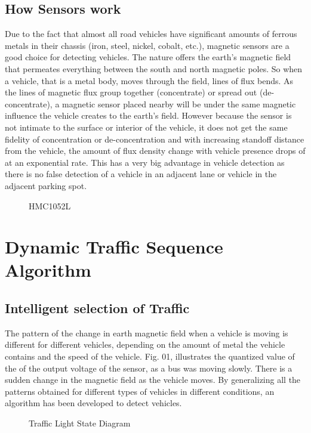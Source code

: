 \documentclass{SureshLimkar}
\begin{document}
\section{How Sensors work}
\hspace {0.5 in}Due to the fact that almost all road vehicles have significant amounts of ferrous metals in their chassis (iron, steel, nickel, cobalt, etc.), magnetic sensors are a good choice for detecting vehicles. The nature offers the earth’s magnetic field that permeates everything between the south and north magnetic poles. So when a vehicle, that is a metal body, moves through the field, lines of flux bends. As the lines of magnetic flux group together (concentrate) or spread out (de-concentrate), a magnetic sensor placed nearby will be under the same magnetic influence the vehicle creates to the earth’s field. However because the sensor is not intimate to the surface or interior of the vehicle, it does not get the same fidelity of concentration or de-concentration and with increasing standoff distance from the vehicle, the amount of flux density change with vehicle presence drops of at an exponential rate. This has a very big advantage in vehicle detection as there is no false detection of a vehicle in an adjacent lane or vehicle in the adjacent parking spot.
\begin{figure}[h]%
\centering
{}%
\caption{}%
\caption{ HMC1052L }%
\label{HMC1052L}%

\end{figure}


\chapter{Dynamic Traffic Sequence Algorithm}
\section {Intelligent selection of Traffic}
\hspace {0.5 in} The pattern of the change in earth magnetic field when a vehicle is moving is different for different vehicles, depending on the amount of metal the vehicle contains and the speed of the vehicle.  Fig. 01, illustrates the quantized value of the of the output voltage of the sensor, as a bus was moving slowly. There is a sudden change in the magnetic field as the vehicle moves.  By generalizing all the patterns obtained for different types of vehicles in different conditions, an algorithm has been developed to detect vehicles.  
\begin{figure}[h]%
\centering
{}%
\caption{Traffic Light State Diagram}%
\label{Traffic Light State Diagram}%
\end{figure}
\end{document}
